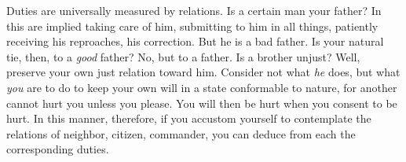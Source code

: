Duties are universally measured by relations. Is a certain man your
father? In this are implied taking care of him, submitting to him in all
things, patiently receiving his reproaches, his correction. But he is a
bad father. Is your natural tie, then, to a \emph{good} father? No, but to a
father. Is a brother unjust? Well, preserve your own just relation toward
him. Consider not what \emph{he} does, but what \emph{you} are to do to keep your
own will in a state conformable to nature, for another cannot hurt you
unless you please. You will then be hurt when you consent to be hurt. In
this manner, therefore, if you accustom yourself to contemplate the
relations of neighbor, citizen, commander, you can deduce from each the
corresponding duties.
